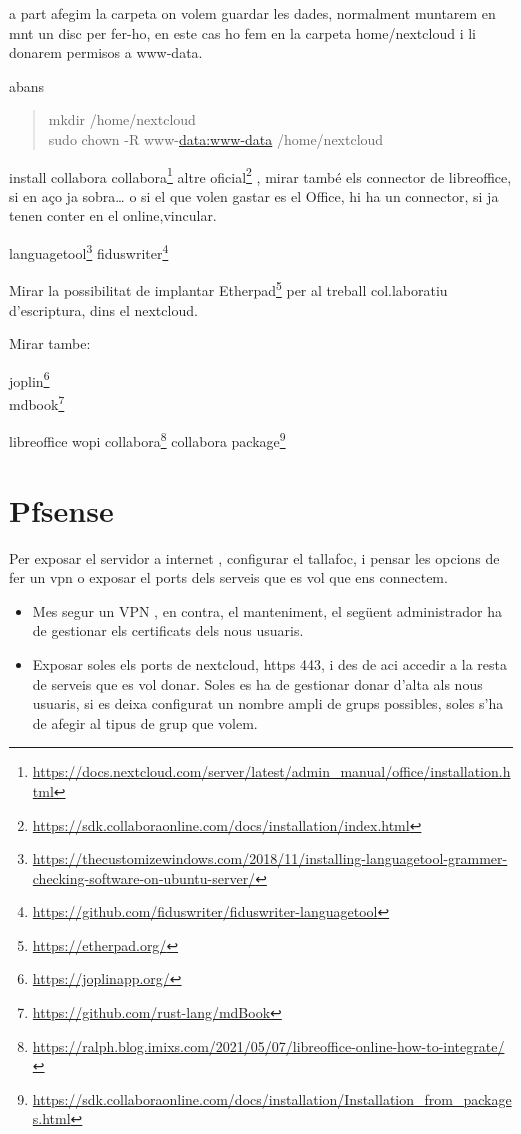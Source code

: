 \documentclass[
  10pt,
]{krantz}
\DeclareRobustCommand{\href}[2]{#2\footnote{\url{#1}}}
\providecommand{\tightlist}{%
  \setlength{\itemsep}{0pt}\setlength{\parskip}{0pt}}
\begin{document}
a part afegim la carpeta on volem guardar les dades, normalment muntarem en mnt un disc per fer-ho, en este cas ho fem en la carpeta home/nextcloud i li donarem permisos a www-data.

abans

\begin{quote}
mkdir /home/nextcloud\\
sudo chown -R www-\url{data:www-data} /home/nextcloud
\end{quote}

install collabora \href{https://docs.nextcloud.com/server/latest/admin_manual/office/installation.html}{collabora} \href{https://sdk.collaboraonline.com/docs/installation/index.html}{altre oficial} , mirar també els connector de libreoffice, si en aço ja sobra\ldots{} o si el que volen gastar es el Office, hi ha un connector, si ja tenen conter en el online,vincular.

\href{https://thecustomizewindows.com/2018/11/installing-languagetool-grammer-checking-software-on-ubuntu-server/}{languagetool} \href{https://github.com/fiduswriter/fiduswriter-languagetool}{fiduswriter}

Mirar la possibilitat de implantar \href{https://etherpad.org/}{Etherpad} per al treball col.laboratiu d'escriptura, dins el nextcloud.

Mirar tambe:

\href{https://joplinapp.org/}{joplin}\\
\href{https://github.com/rust-lang/mdBook}{mdbook}

\href{https://ralph.blog.imixs.com/2021/05/07/libreoffice-online-how-to-integrate/}{libreoffice wopi collabora} \href{https://sdk.collaboraonline.com/docs/installation/Installation_from_packages.html}{collabora package}

\hypertarget{pfsense}{%
\section{Pfsense}\label{pfsense}}

Per exposar el servidor a internet , configurar el tallafoc, i pensar les opcions de fer un vpn o exposar el ports dels serveis que es vol que ens connectem.

\begin{itemize}
\tightlist
\item
  Mes segur un VPN , en contra, el manteniment, el següent administrador ha de gestionar els certificats dels nous usuaris.
\item
  Exposar soles els ports de nextcloud, https 443, i des de aci accedir a la resta de serveis que es vol donar. Soles es ha de gestionar donar d'alta als nous usuaris, si es deixa configurat un nombre ampli de grups possibles, soles s'ha de afegir al tipus de grup que volem.
\end{itemize}
\end{document}
